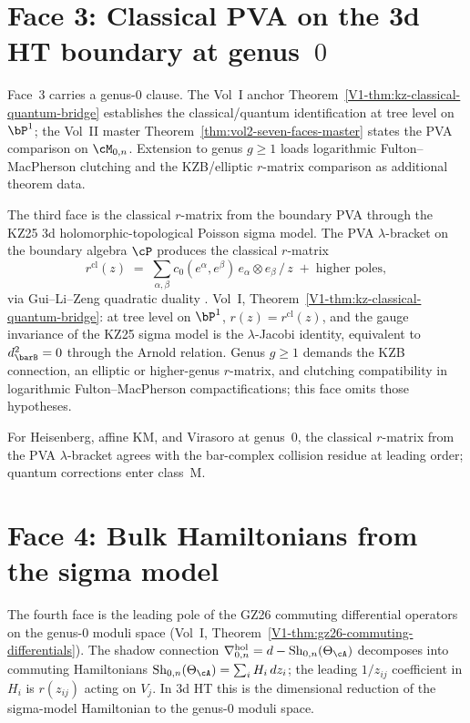 \section{Face 3: Classical PVA on the 3d HT boundary at
genus~$0$}
\label{sec:face-3-classical-pva}

\begin{remark}
\label{rem:face-3-genus-zero}
Face~3 carries a genus-$0$ clause. The Vol~I anchor
Theorem~\ref{V1-thm:kz-classical-quantum-bridge} establishes the
classical/quantum identification at tree level on $\bP^1$; the
Vol~II master Theorem~\ref{thm:vol2-seven-faces-master} states
the PVA comparison on $\cM_{0,n}$. Extension to genus $g\geq 1$
loads logarithmic Fulton--MacPherson clutching and the
KZB/elliptic $r$-matrix comparison as additional theorem data.
\end{remark}

The third face is the classical $r$-matrix from the boundary PVA
through the KZ25 3d holomorphic-topological Poisson sigma model.
The PVA $\lambda$-bracket on the boundary algebra $\cP$ produces
the classical $r$-matrix
\[
r^{\mathrm{cl}}(z)
\;=\;
\sum_{\alpha,\beta} c_0(e^\alpha,e^\beta)\,e_\alpha\otimes e_\beta\,/\,z
\;+\;\text{higher poles},
\]
via Gui--Li--Zeng quadratic duality \cite{GLZ22}. Vol~I,
Theorem~\ref{V1-thm:kz-classical-quantum-bridge}: at tree level on
$\bP^1$, $r(z) = r^{\mathrm{cl}}(z)$, and the gauge invariance of
the KZ25 sigma model is the $\lambda$-Jacobi identity, equivalent
to $d_{\barB}^2 = 0$ through the Arnold relation. Genus $g\geq 1$
demands the KZB connection, an elliptic or higher-genus
$r$-matrix, and clutching compatibility in logarithmic
Fulton--MacPherson compactifications; this face omits those
hypotheses.

For Heisenberg, affine KM, and Virasoro at genus~$0$, the
classical $r$-matrix from the PVA $\lambda$-bracket agrees with
the bar-complex collision residue at leading order; quantum
corrections enter class~M.

\section{Face 4: Bulk Hamiltonians from the sigma model}
\label{sec:face-4-bulk-hamiltonians}

The fourth face is the leading pole of the GZ26 commuting
differential operators on the genus-$0$ moduli space (Vol~I,
Theorem~\ref{V1-thm:gz26-commuting-differentials}). The shadow
connection
$\nabla^{\mathrm{hol}}_{0,n} = d - \operatorname{Sh}_{0,n}(\Theta_\cA)$
decomposes into commuting Hamiltonians
$\operatorname{Sh}_{0,n}(\Theta_\cA) = \sum_i H_i\,dz_i$; the
leading $1/z_{ij}$ coefficient in $H_i$ is $r(z_{ij})$ acting on
$V_j$. In 3d HT this is the dimensional reduction of the
sigma-model Hamiltonian to the genus-$0$ moduli space.

